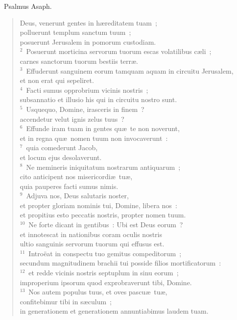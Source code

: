~\lettrine[lines=10,image=true,loversize=0.05,lraise=-0.03]{P}{}salmus Asaph. \begin{flushleft}\begin{verse}\vspace{6pt}Deus, venerunt gentes in h\ae reditatem tuam~;\\ polluerunt templum sanctum tuum~;\\ posuerunt Jerusalem in pomorum custodiam.\\
${}^{2}$~Posuerunt morticina servorum tuorum escas volatilibus c\ae li~;\\ carnes sanctorum tuorum bestiis terr\ae .\\
${}^{3}$~Effuderunt sanguinem eorum tamquam aquam in circuitu Jerusalem,\\ et non erat qui sepeliret.\\
${}^{4}$~Facti sumus opprobrium vicinis nostris~;\\ subsannatio et illusio his qui in circuitu nostro sunt.\\
${}^{5}$~Usquequo, Domine, irasceris in finem~?\\ accendetur velut ignis zelus tuus~?\\
${}^{6}$~Effunde iram tuam in gentes qu\ae\ te non noverunt,\\ et in regna qu\ae\ nomen tuum non invocaverunt~:\\
${}^{7}$~quia comederunt Jacob,\\ et locum ejus desolaverunt.\\
${}^{8}$~Ne memineris iniquitatum nostrarum antiquarum~;\\ cito anticipent nos misericordi\ae\ tu\ae ,\\ quia pauperes facti sumus nimis.\\
${}^{9}$~Adjuva nos, Deus salutaris noster,\\ et propter gloriam nominis tui, Domine, libera nos~:\\ et propitius esto peccatis nostris, propter nomen tuum.\\
${}^{10}$~Ne forte dicant in gentibus~: Ubi est Deus eorum~?\\ et innotescat in nationibus coram oculis nostris\\ ultio sanguinis servorum tuorum qui effusus est.\\
${}^{11}$~Intro\"eat in conspectu tuo gemitus compeditorum~;\\ secundum magnitudinem brachii tui posside filios mortificatorum~:\\
${}^{12}$~et redde vicinis nostris septuplum in sinu eorum~;\\ improperium ipsorum quod exprobraverunt tibi, Domine.\\
${}^{13}$~Nos autem populus tuus, et oves pascu\ae\ tu\ae ,\\ confitebimur tibi in s\ae culum~;\\ in generationem et generationem annuntiabimus laudem tuam.\end{verse}\end{flushleft}


